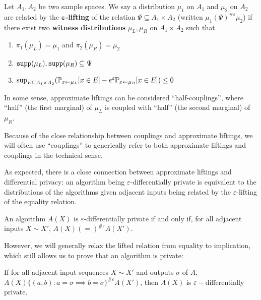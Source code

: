 \begin{defn}
    Let $A_1, A_2$ be two sample spaces. We say a distribution $\mu_1$ on $A_1$ and $\mu_2$ on $A_2$ are related by the $\mathbf{\varepsilon}$\textbf{-lifting} of the relation $\Psi\subseteq A_1\times A_2$ (written $\mu_1(\Psi)^{\#\varepsilon}\mu_2$) if there exist two \textbf{witness distributions} $\mu_L, \mu_R$ on $A_1\times A_2$ such that\begin{enumerate}
        \item $\pi_1(\mu_L) = \mu_1$ and $\pi_2(\mu_R) = \mu_2$
        \item $\texttt{supp}(\mu_L), \texttt{supp}(\mu_R)\subseteq \Psi$
        \item $\sup_{E\subseteq A_1\times A_2}(\mathbb{P}_{x\gets \mu_L}[x\in E]- e^\varepsilon \mathbb{P}_{x\gets \mu_R}[x\in E])\leq 0$
    \end{enumerate}
\end{defn}

In some sense, approximate liftings can be considered ``half-couplings'', where ``half'' (the first marginal) of $\mu_L$ is coupled with ``half'' (the second marginal) of $\mu_R$. 

Because of the close relationship between couplings and approximate liftings, we will often use ``couplings'' to generically refer to both approximate liftings and couplings in the technical sense.

As expected, there is a close connection between approximate liftings and differential privacy: an algorithm being $\varepsilon$-differentially private is equivalent to the distributions of the algorithms given adjacent inputs being related by the $\varepsilon$-lifting of the equality relation.

\begin{thm}
    An algorithm $A(X)$ is $\varepsilon$-differentially private if and only if, for all adjacent inputs $X\sim X'$, $A(X)(=)^{\#\varepsilon}A(X')$.
\end{thm}

However, we will generally relax the lifted relation from equality to implication, which still allows us to prove that an algorithm is private:

\begin{thm}\label{implicationcouplingthm}
    If for all adjacent input sequences $X\sim X'$ and outputs $\sigma$ of $A$, $A(X)\{(a, b): a=\sigma\implies b=\sigma\}^{\#\varepsilon}A(X')$, then $A(X)$ is $\varepsilon-$differentially private.
\end{thm}

